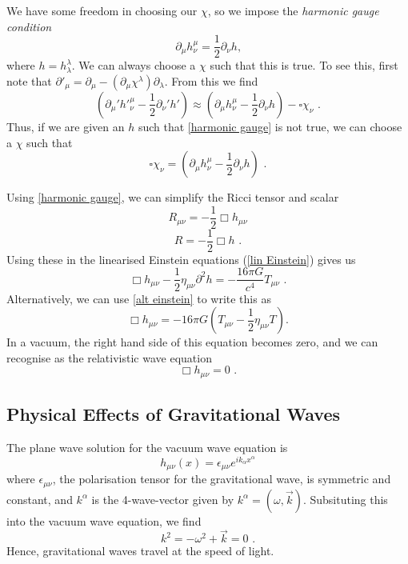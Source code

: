 \documentclass[11pt]{cuthesis}
\newcommand{\mn}{_{\mu\nu}}
\newcommand{\fs}{\text{ .}}
\begin{document}
We have some freedom in choosing our $\chi$, so we impose the \textit{harmonic gauge condition}
\begin{equation} \label{harmonic gauge}
\partial_\mu h^\mu_\nu = \frac{1}{2} \partial_\nu h \text{,}
\end{equation}
where $h=h^\lambda_\lambda$. We can always choose a $\chi$ such that this is true. To see this, first note that $\partial'_\mu = \partial_\mu - (\partial_\mu \chi^\lambda) \partial_\lambda$. From this we find
\begin{equation}
(\partial_\mu' {h'}_\nu^\mu - \frac{1}{2}\partial_\nu' h') \approx (\partial_\mu h^\mu_\nu - \frac{1}{2} \partial_\nu h ) -\square \chi_\nu \fs
\end{equation}
Thus, if we are given an $h$ such that \ref{harmonic gauge} is not true, we can choose a $\chi$ such that 
\begin{equation} \label{harmonic chi}
\square \chi_\nu = (\partial_\mu h^\mu_\nu - \frac{1}{2}\partial_\nu h) \fs
\end{equation}

Using \ref{harmonic gauge}, we can simplify the Ricci tensor and scalar
\begin{equation}
R\mn = -\frac{1}{2}\Box h\mn
\end{equation}
\begin{equation}
R=-\frac{1}{2}\Box h \fs
\end{equation}
Using these in the linearised Einstein equations (\ref{lin Einstein}) gives us
\begin{equation}
\Box h\mn - \frac{1}{2}\eta\mn\partial^2 h =-\frac{16\pi G}{c^4}T\mn \fs
\end{equation}
Alternatively, we can use \ref{alt einstein} to write this as
\begin{equation}
\Box h\mn = -16\pi G \left( T\mn -\frac{1}{2} \eta\mn T \right). 
\end{equation}
In a vacuum, the right hand side of this equation becomes zero, and we can recognise as the relativistic wave equation
 \begin{equation}
\Box h\mn = 0 \fs
\end{equation}

\subsection{Physical Effects of Gravitational Waves}
The plane wave solution for the vacuum wave equation is
\begin{equation} \label{plane wave}
h\mn (x) = \epsilon\mn e^{ik_\alpha x^\alpha} 
\end{equation}
where $\epsilon\mn$, the polarisation tensor for the gravitational wave, is symmetric and constant, and $k^\alpha$ is the 4-wave-vector given by $k^\alpha = (\omega,\vec{k})$. Subsituting this into the vacuum wave equation, we find 
\begin{equation}
k^2 = -\omega^2 + \vec{k} =0 \fs
\end{equation}
Hence, gravitational waves travel at the speed of light. 
\end{document}
